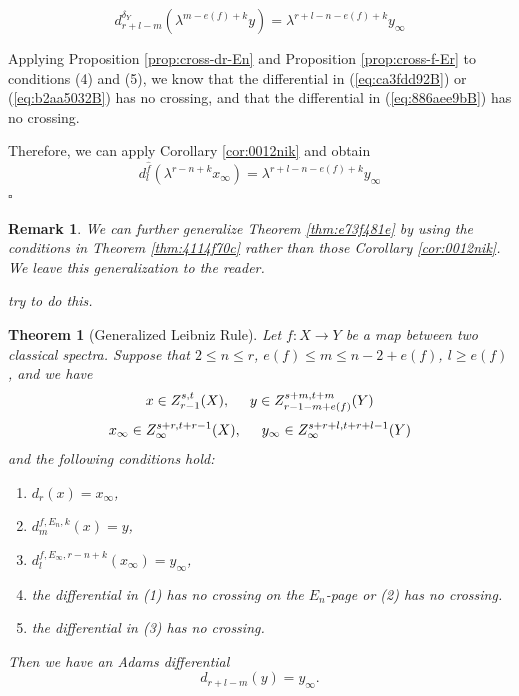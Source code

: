 \documentclass[12pt,a4paper]{article}
\renewenvironment{proof}{{\noindent\it\textbf{Proof}}\quad\it}{\hfill$\square$}
\newtheorem{remark}[equation]{Remark}
\newtheorem{theorem}[equation]{Theorem}
\begin{document}
\begin{sloppy}
\begin{proof}
$$d_{r+l-m}^{\delta_Y}(\lambda^{m-e(f)+k}y)= \lambda^{r+l-n-e(f)+k}y_\infty$$

    Applying Proposition \ref{prop:cross-dr-En} and Proposition \ref{prop:cross-f-Er} to conditions (4) and (5), we know that the differential in (\ref{eq:ca3fdd92B}) or (\ref{eq:b2aa5032B}) has no crossing, and that the differential in (\ref{eq:886aee9bB}) has no crossing.

    Therefore, we can apply Corollary \ref{cor:0012nik} and obtain
   $$d^{\hat{f}}_{l}(\lambda^{r-n+k}x_\infty) = \lambda^{r+l-n-e(f)+k}y_\infty$$
\end{proof}
\begin{remark}
    We can further generalize Theorem \ref{thm:e73f481e} by using the conditions in Theorem \ref{thm:4114f70c} rather than those Corollary \ref{cor:0012nik}. We leave this generalization to the reader.

    try to do this.
\end{remark}

\begin{theorem}[Generalized Leibniz Rule]\label{thm:e73f481eB}
    Let $f: X\to Y$ be a map between two classical spectra.
    Suppose that $2\le n\le r$, $e(f)\le m\le n-2+e(f)$, $l\ge e(f)$, and we have
    $$x\in Z_{r-1}^{s,t}(X), \hspace{0.5cm} y\in Z_{r-1-m+e(f)}^{s+m,t+m}(Y)$$
    $$x_\infty\in Z_\infty^{s+r,t+r-1}(X), \hspace{0.5cm} y_\infty\in Z_\infty^{s+r+l,t+r+l-1}(Y)$$
    and the following conditions hold:
    \begin{enumerate}
        \item $d_{r}(x)=x_\infty$,
        \item $d_{m}^{f,E_n, k}(x)=y$,
        \item $d_{l}^{f,E_\infty, r-n+k}(x_\infty)=y_\infty$,
        \item the differential in (1) has no crossing on the $E_n$-page or (2) has no crossing.
        \item the differential in (3) has no crossing.%
    \end{enumerate}
    Then we  have an Adams differential
    $$d_{r+l-m}(y)= y_\infty.$$
    

\end{theorem}
\end{sloppy}
\end{document}

